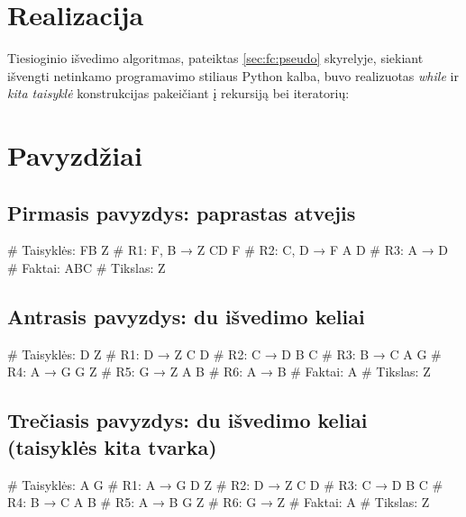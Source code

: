 \section{Realizacija}

Tiesioginio išvedimo algoritmas, pateiktas \ref{sec:fc:pseudo}
skyrelyje, siekiant išvengti netinkamo programavimo stiliaus Python
kalba, buvo realizuotas \emph{while} ir \emph{kita taisyklė}
konstrukcijas pakeičiant į rekursiją bei iteratorių:


\section{Pavyzdžiai}

\subsection{Pirmasis pavyzdys: paprastas atvejis}

\begin{pythonaienv}[fc]
# Taisyklės:
FB Z                                    # R1: F, B → Z
CD F                                    # R2: C, D → F
A D                                     # R3: A → D
# Faktai:
ABC
# Tikslas:
Z
\end{pythonaienv}

\subsection{Antrasis pavyzdys: du išvedimo keliai}

\begin{pythonaienv}[fc]
# Taisyklės:
D Z                                     # R1: D → Z
C D                                     # R2: C → D
B C                                     # R3: B → C
A G                                     # R4: A → G
G Z                                     # R5: G → Z
A B                                     # R6: A → B
# Faktai:
A
# Tikslas:
Z
\end{pythonaienv}

\subsection{Trečiasis pavyzdys: du išvedimo keliai (taisyklės kita tvarka)}

\begin{pythonaienv}[fc]
# Taisyklės:
A G                                     # R1: A → G
D Z                                     # R2: D → Z
C D                                     # R3: C → D
B C                                     # R4: B → C
A B                                     # R5: A → B
G Z                                     # R6: G → Z
# Faktai:
A
# Tikslas:
Z
\end{pythonaienv}

